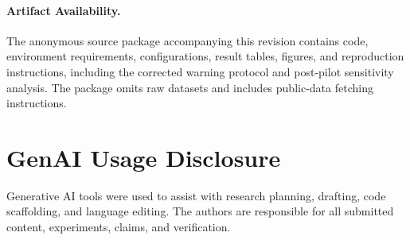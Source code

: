 \documentclass[sigconf,anonymous]{acmart}
\begin{document}
\paragraph*{Artifact Availability.}
\begin{sloppypar}
The anonymous source package accompanying this revision contains code, environment requirements, configurations, result tables, figures, and reproduction instructions, including the corrected warning protocol and post-pilot sensitivity analysis. The package omits raw datasets and includes public-data fetching instructions.
\end{sloppypar}

\section*{GenAI Usage Disclosure}

Generative AI tools were used to assist with research planning, drafting, code scaffolding, and language editing. The authors are responsible for all submitted content, experiments, claims, and verification.



\end{document}
